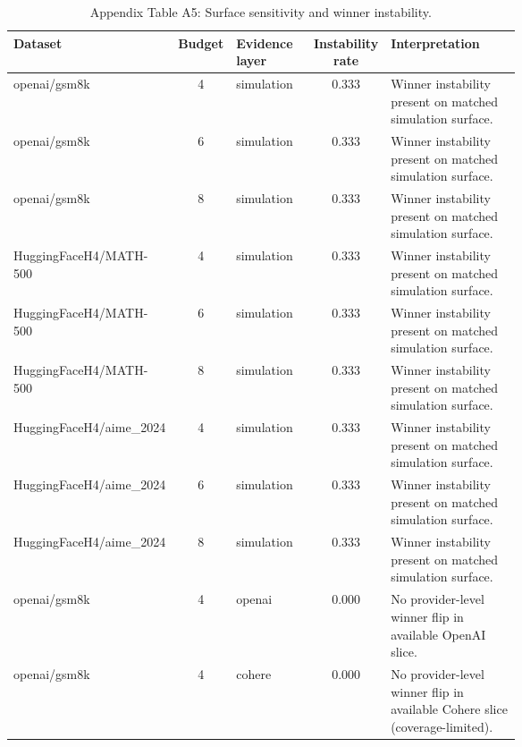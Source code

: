 \begin{table}[t]
\centering
\small
\caption{Appendix Table A5: Surface sensitivity and winner instability.}
\begin{tabular}{p{0.22\linewidth}c p{0.16\linewidth} c p{0.28\linewidth}}
\hline
\textbf{Dataset} & \textbf{Budget} & \textbf{Evidence layer} & \textbf{Instability rate} & \textbf{Interpretation} \\
\hline
openai/gsm8k & 4 & simulation & 0.333 & Winner instability present on matched simulation surface. \\
openai/gsm8k & 6 & simulation & 0.333 & Winner instability present on matched simulation surface. \\
openai/gsm8k & 8 & simulation & 0.333 & Winner instability present on matched simulation surface. \\
HuggingFaceH4/MATH-500 & 4 & simulation & 0.333 & Winner instability present on matched simulation surface. \\
HuggingFaceH4/MATH-500 & 6 & simulation & 0.333 & Winner instability present on matched simulation surface. \\
HuggingFaceH4/MATH-500 & 8 & simulation & 0.333 & Winner instability present on matched simulation surface. \\
HuggingFaceH4/aime\_2024 & 4 & simulation & 0.333 & Winner instability present on matched simulation surface. \\
HuggingFaceH4/aime\_2024 & 6 & simulation & 0.333 & Winner instability present on matched simulation surface. \\
HuggingFaceH4/aime\_2024 & 8 & simulation & 0.333 & Winner instability present on matched simulation surface. \\
openai/gsm8k & 4 & openai & 0.000 & No provider-level winner flip in available OpenAI slice. \\
openai/gsm8k & 4 & cohere & 0.000 & No provider-level winner flip in available Cohere slice (coverage-limited). \\
\hline
\end{tabular}
\end{table}

